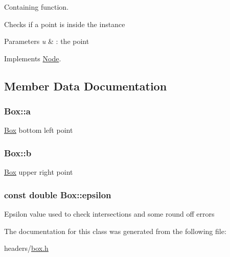 \-Containing function. 

\-Checks if a point is inside the instance


\begin{DoxyParams}{\-Parameters}
{\em u} & \-: the point \\
\hline
\end{DoxyParams}


\-Implements \hyperlink{class_node_aeecdf01a88be40840b65eb34cecc7a3c}{\-Node}.



\subsection{\-Member \-Data \-Documentation}
\hypertarget{class_box_af9c25486a750badb5e746ba616e44bce}{
\subsubsection[{a}]{ {\bf \-Box\-::a}}}
\label{class_box_af9c25486a750badb5e746ba616e44bce}
\hyperlink{class_box}{\-Box} bottom left point \hypertarget{class_box_a9ba6812e3bc99ab5faf29f44550b57f5}{
\subsubsection[{b}]{ {\bf \-Box\-::b}}}
\label{class_box_a9ba6812e3bc99ab5faf29f44550b57f5}
\hyperlink{class_box}{\-Box} upper right point \hypertarget{class_box_ab038c94f04821a9ab0e0313819e5187c}{
\subsubsection[{epsilon}]{\setlength{\rightskip}{0pt plus 5cm}const double {\bf \-Box\-::epsilon}}}
\label{class_box_ab038c94f04821a9ab0e0313819e5187c}
\-Epsilon value used to check intersections and some round off errors 

\-The documentation for this class was generated from the following file\-:\begin{DoxyCompactItemize}
\item 
headers/\hyperlink{box_8h}{box.\-h}\end{DoxyCompactItemize}
